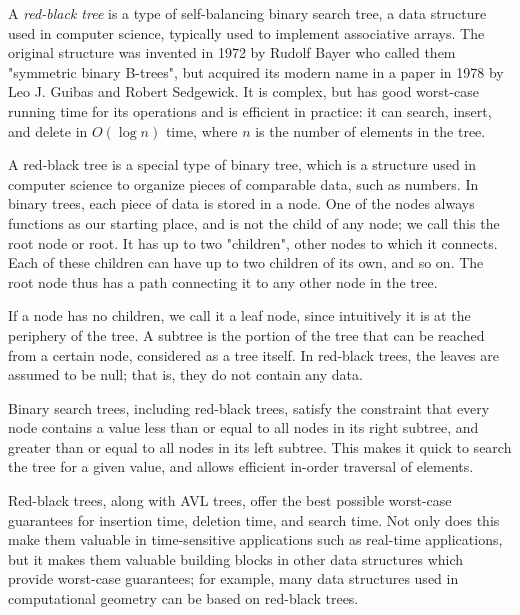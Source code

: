 \documentclass[12pt]{article}
\begin{document}

A {\em red-black tree} is a type of self-balancing binary search tree, a data structure used in computer science, typically used to implement associative arrays. The original structure was invented in 1972 by Rudolf Bayer who called them "symmetric binary B-trees", but acquired its modern name in a paper in 1978 by Leo J. Guibas and Robert Sedgewick. It is complex, but has good worst-case running time for its operations and is efficient in practice: it can search, insert, and delete in $O(\log n)$ time, where $n$ is the number of elements in the tree.

A red-black tree is a special type of binary tree, which is a structure used in computer science to organize pieces of comparable data, such as numbers. In binary trees, each piece of data is stored in a node. One of the nodes always functions as our starting place, and is not the child of any node; we call this the root node or root. It has up to two "children", other nodes to which it connects. Each of these children can have up to two children of its own, and so on. The root node thus has a path connecting it to any other node in the tree.

If a node has no children, we call it a leaf node, since intuitively it is at the periphery of the tree. A subtree is the portion of the tree that can be reached from a certain node, considered as a tree itself. In red-black trees, the leaves are assumed to be null; that is, they do not contain any data.

Binary search trees, including red-black trees, satisfy the constraint that every node contains a value less than or equal to all nodes in its right subtree, and greater than or equal to all nodes in its left subtree. This makes it quick to search the tree for a given value, and allows efficient in-order traversal of elements.

Red-black trees, along with AVL trees, offer the best possible worst-case guarantees for insertion time, deletion time, and search time. Not only does this make them valuable in time-sensitive applications such as real-time applications, but it makes them valuable building blocks in other data structures which provide worst-case guarantees; for example, many data structures used in computational geometry can be based on red-black trees.
\end{document}
